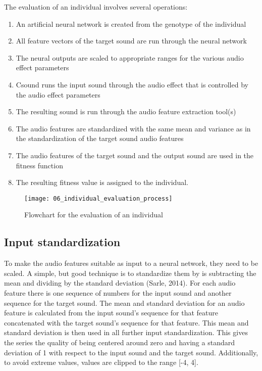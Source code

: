 The evaluation of an individual involves several operations:

\begin{enumerate}  
\item An artificial neural network is created from the genotype of the individual
\item All feature vectors of the target sound are run through the neural network
\item The neural outputs are scaled to appropriate ranges for the various audio effect parameters
\item Csound runs the input sound through the audio effect that is controlled by the audio effect parameters
\item The resulting sound is run through the audio feature extraction tool(s)
\item The audio features are standardized with the same mean and variance as in the standardization of the target sound audio features
\item The audio features of the target sound and the output sound are used in the fitness function
\item The resulting fitness value is assigned to the individual.
\end{enumerate}

\begin{figure}[h]
    \centering
    \texttt{[image: 06\_individual\_evaluation\_process]}
    \caption{Flowchart for the evaluation of an individual}
    \label{fig:individual_evaluation_process}
\end{figure}

\subsection{Input standardization}
To make the audio features suitable as input to a neural network, they need to be scaled. A simple, but good technique is to standardize them by is subtracting the mean and dividing by the standard deviation (Sarle, 2014). For each audio feature there is one sequence of numbers for the input sound and another sequence for the target sound. The mean and standard deviation for an audio feature is calculated from the input sound’s sequence for that feature concatenated with the target sound’s sequence for that feature. This mean and standard deviation is then used in all further input standardization. This gives the series the quality of being centered around zero and having a standard deviation of 1 with respect to the input sound and the target sound. Additionally, to avoid extreme values, values are clipped to the range [-4, 4].

